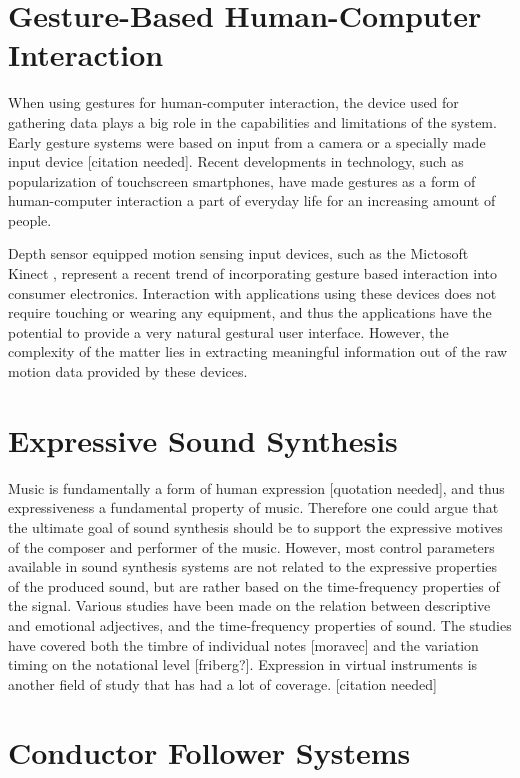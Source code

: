 \section{Gesture-Based Human-Computer Interaction}

When using gestures for human-computer interaction,
the device used for gathering data plays a big role
in the capabilities and limitations of the system.
Early gesture systems were based on input from
a camera or a specially made input device [citation needed].
Recent developments in technology,
such as popularization of touchscreen smartphones,
have made gestures as a form of human-computer interaction
a part of everyday life for an increasing amount of people.

Depth sensor equipped motion sensing input devices,
such as the Mictosoft Kinect \cite{},
represent a recent trend of incorporating gesture based interaction
into consumer electronics.
Interaction with applications using these devices
does not require touching or wearing any equipment,
and thus the applications have the potential to provide
a very natural gestural user interface.
However, the complexity of the matter lies in extracting
meaningful information out of the raw motion data provided by these devices.


\section{Expressive Sound Synthesis}

Music is fundamentally a form of human expression [quotation needed],
and thus expressiveness a fundamental property of music.
Therefore one could argue that the ultimate goal of sound synthesis should be to support
the expressive motives of the composer and performer of the music.
However, most control parameters available in sound synthesis systems
are not related to the expressive properties of the produced sound,
but are rather based on the time-frequency properties of the signal.
Various studies have been made on the relation between
descriptive and emotional adjectives,
and the time-frequency properties of sound.
The studies have covered both the timbre of individual notes [moravec] 
and the variation timing on the notational level [friberg?].
Expression in virtual instruments is another field of study
that has had a lot of coverage. [citation needed]




\section{Conductor Follower Systems}

